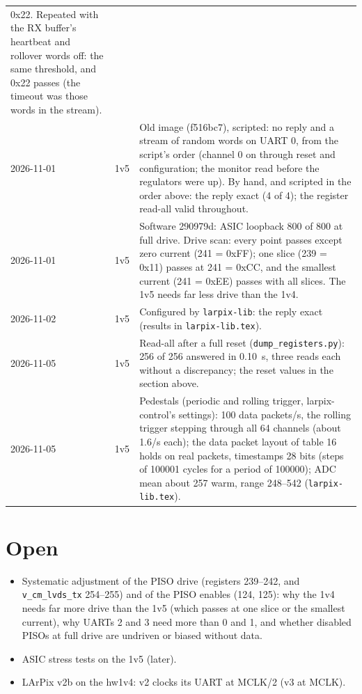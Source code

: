 \documentclass[11pt]{article}
\newcommand{\h}[1]{\texttt{#1}}
\begin{document}
\begin{center}
\begin{tabularx}{\linewidth}{@{}llL@{}}
  0x22.  Repeated with the RX buffer's heartbeat and rollover words off: the same threshold, and 0x22 passes (the
  timeout was those words in the stream). \\
2026-11-01 & 1v5 & Old image (f516bc7), scripted: no reply and a stream of random words on UART 0, from the script's
  order (channel 0 on through reset and configuration; the monitor read before the regulators were up).  By hand,
  and scripted in the order above: the reply exact (4 of 4); the register read-all valid throughout. \\
2026-11-01 & 1v5 & Software 290979d: ASIC loopback 800 of 800 at full drive.  Drive scan: every point passes except
  zero current (241 = 0xFF); one slice (239 = 0x11) passes at 241 = 0xCC, and the smallest current (241 = 0xEE)
  passes with all slices.  The 1v5 needs far less drive than the 1v4. \\
2026-11-02 & 1v5 & Configured by \h{larpix-lib}: the reply exact (results in \h{larpix-lib.tex}). \\
2026-11-05 & 1v5 & Read-all after a full reset (\h{dump\_registers.py}):  256 of 256 answered in 0.10~s, three reads
  each without a discrepancy;  the reset values in the section above. \\
2026-11-05 & 1v5 & Pedestals (periodic and rolling trigger, larpix-control's settings):  100 data packets/s, the
  rolling trigger stepping through all 64 channels (about 1.6/s each);  the data packet layout of table 16 holds on
  real packets, timestamps 28 bits (steps of 100001 cycles for a period of 100000);  ADC mean about 257 warm, range
  248--542 (\h{larpix-lib.tex}). \\
\bottomrule
\end{tabularx}
\end{center}

\section{Open}

\begin{itemize}
\item Systematic adjustment of the PISO drive (registers 239--242, and \h{v\_cm\_lvds\_tx} 254--255) and of the PISO
  enables (124, 125): why the 1v4 needs far more drive than the 1v5 (which passes at one slice or the smallest
  current), why UARTs 2 and 3 need more than 0 and 1, and
  whether disabled PISOs at full drive are undriven or biased without data.
\item ASIC stress tests on the 1v5 (later).
\item LArPix v2b on the hw1v4: v2 clocks its UART at MCLK/2 (v3 at MCLK).
\end{itemize}
\end{document}
